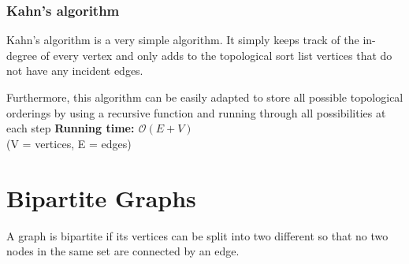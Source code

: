 \subsubsection*{Kahn's algorithm}
Kahn's algorithm is a very simple algorithm. It simply keeps track of the in-degree
of every vertex and only adds to the topological sort list vertices that do not have
any incident edges.

Furthermore, this algorithm can be easily adapted to store all possible topological 
orderings by using a recursive function and running through all possibilities 
at each step
\noindent \textbf{\boldmath Running time: $\mathcal{O}(E+V)$}
\\ {\small(V = vertices, E = edges)}


\newpage
\section{Bipartite Graphs}
A graph is bipartite if its  vertices can be split into two different so that
no two nodes in the same set are connected by an edge.
